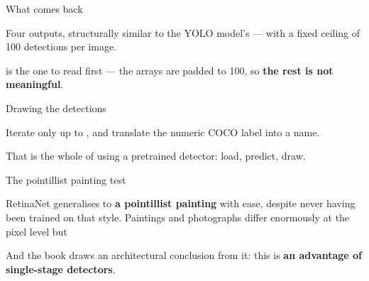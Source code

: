 \documentclass[aspectratio=169,11pt,t]{beamer}
\begin{document}
\begin{frame}[shrink=25]{What comes back}
{\fontsize{9.4}{12.6}\selectfont\color{fg2}Four outputs, structurally similar to the YOLO model's --- with a fixed ceiling of 100 detections per image.\par}\vskip 4pt
{\fontsize{9.4}{12.6}\selectfont\color{fg2} is the one to read first --- the arrays are padded to 100, so \textbf{the rest is not meaningful}.\par}\vskip 4pt
\end{frame}

\begin{frame}[shrink=25]{Drawing the detections}
{\fontsize{9.4}{12.6}\selectfont\color{fg2}Iterate only up to , and translate the numeric COCO label into a name.\par}\vskip 4pt
{\fontsize{9.4}{12.6}\selectfont\color{fg2}That is the whole of using a pretrained detector: load, predict, draw.\par}\vskip 4pt
\end{frame}

\begin{frame}[shrink=25]{The pointillist painting test}
\begin{iband}[signal]
RetinaNet generalises to \textbf{a pointillist painting} with ease, despite never having been trained on that style. Paintings and photographs differ enormously at the pixel level but 
\end{iband}
{\fontsize{9.4}{12.6}\selectfont\color{fg2}And the book draws an architectural conclusion from it: this is \textbf{an advantage of single-stage detectors}.\par}\vskip 4pt
\end{frame}
\end{document}
